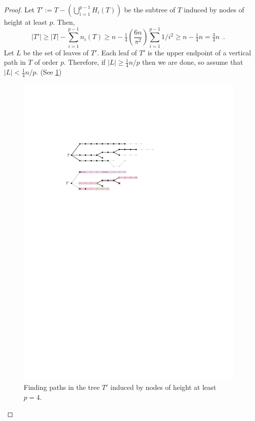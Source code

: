 \documentclass[kpfonts,lotsofwhite]{patmorin}
\renewcommand{\ge}{\geqslant}
\theoremstyle{plain}
\theoremstyle{definition}
\begin{document}
\begin{proof}
  Let $T':=T-(\bigcup_{i=1}^{p-1} H_i(T))$ be the subtree of $T$ induced by nodes of height at least $p$.  Then,
  \[
    |T'|\ge |T| - \sum_{i=1}^{p-1} n_i(T)
    \ge n - \tfrac{1}{4}\left(\frac{6n}{\pi^2}\right)\sum_{i=1}^{p-1} 1/i^2
    \ge  n - \tfrac{1}{4}n = \tfrac{3}{4}n \enspace .
  \]
  Let $L$ be the set of leaves of $T'$.  Each leaf of $T'$ is the upper endpoint of a vertical path in $T$ of order $p$.  Therefore, if $|L|\ge \tfrac{1}{4}n/p$ then we are done, so assume that $|L|<\tfrac{1}{4}n/p$.  (See \cref{disjoint_p_paths_figs})

  \begin{figure}
    \begin{center}
      \includegraphics{figs/disjoint-paths}
    \end{center}
    \caption{Finding paths in the tree $T'$ induced by nodes of height at least $p=4$.}
    \label{disjoint_p_paths_figs}
  \end{figure}


\end{proof}
\end{document}

